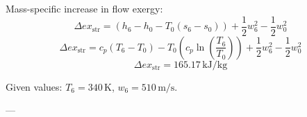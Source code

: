 Mass-specific increase in flow exergy:  
\[ \Delta ex_{\text{str}} = (h_6 - h_0 - T_0 (s_6 - s_0)) + \frac{1}{2} w_6^2 - \frac{1}{2} w_0^2 \]  
\[ \Delta ex_{\text{str}} = c_p (T_6 - T_0) - T_0 \left( c_p \ln \left( \frac{T_6}{T_0} \right) \right) + \frac{1}{2} w_6^2 - \frac{1}{2} w_0^2 \]  
\[ \Delta ex_{\text{str}} = 165.17 \, \text{kJ/kg} \]  

Given values:  
\( T_6 = 340 \, \text{K} \), \( w_6 = 510 \, \text{m/s} \).  

---